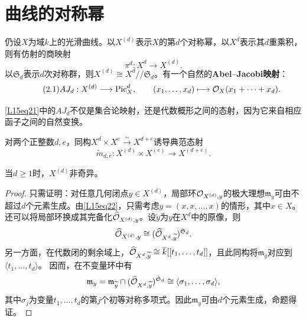 \section{曲线的对称幂}\label{L15S2}
仍设$X$为域$k$上的光滑曲线。以$X^{(d)}$表示$X$的第$d$个对称幂，以$X^d$表示其$d$重乘积，则有仿射的商映射
\[\pi^d:X^d\longrightarrow X^{(d)}.\]
以$\mathfrak S_d$表示$d$次对称群，则$X^{(d)}\cong X^d/\!/\mathfrak S_d$。有一个自然的\textbf{Abel--Jacobi映射}：
\begin{equation}\tag{2.1}\label{L15eq21}
AJ_d:X^{(d)}\longrightarrow\operatorname{Pic}_X^d,\qquad (x_1,\ldots,x_d)\longmapsto\mathcal O_X(x_1+\cdots+x_d).
\end{equation}
\begin{note}[L15S2O1]
\eqref{L15eq21}中的$AJ_d$不仅是集合论映射，还是代数概形之间的态射，因为它来自相应函子之间的自然变换。
\end{note}
对两个正整数$d,e$，同构$X^d\times X^e\xrightarrow{\sim}X^{d+e}$诱导典范态射
\begin{equation}\tag{2.2}\label{L15eq22}\widetilde m_{d,e}:X^{(d)}\times X^{(e)}\longrightarrow X^{(d+e)}.\end{equation}
\begin{proposition}\label{L15S2O2}
当$d\ge1$时，$X^{(d)}$非奇异。
\end{proposition}
\begin{proof}
只需证明：对任意几何闭点$y\in X^{(d)}$，局部环$\mathcal O_{X^{(d)},y}$的极大理想$\mathfrak m_y$可由不超过$d$个元素生成。由\eqref{L15eq22}，只需考虑$y=(x,x,\ldots,x)$的情形，其中$x\in X$。还可以将局部环换成其完备化$\widehat{\mathcal O}_{X^{(d)},y}$。设$\widetilde y$为$y$在$X^d$中的原像，则
\[\widehat{\mathcal O}_{X^{(d)},y}\cong(\widehat{\mathcal O}_{X^d,\widetilde y})^{\mathfrak S_d}.\]
另一方面，在代数闭的剩余域上，$\widehat{\mathcal O}_{X^d,\widetilde y}\cong\overline k[[t_1,\ldots,t_d]]$，且此同构将$\mathfrak m_{\widetilde y}$对应到$\langle t_1,\ldots,t_d\rangle$。
因而，在不变量环中有
\[\mathfrak m_y=\mathfrak m_{\widetilde y}\cap(\widehat{\mathcal O}_{X^d,\widetilde y})^{\mathfrak S_d}\cong\langle\sigma_1,\ldots,\sigma_d\rangle,\]
其中$\sigma_j$为变量$t_1,\ldots,t_d$的第$j$个初等对称多项式。因此$\mathfrak m_y$可由$d$个元素生成，命题得证。
\end{proof}
